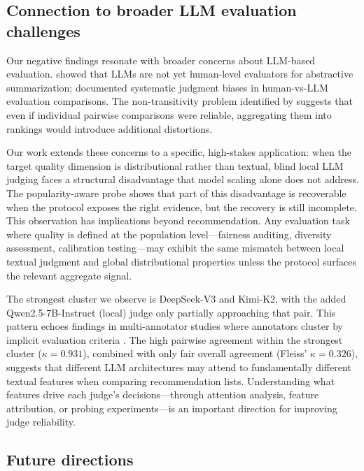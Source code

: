 \documentclass[pdflatex,sn-basic,referee,lineno]{sn-jnl}
\begin{document}
\subsection{Connection to broader LLM evaluation challenges}

Our negative findings resonate with broader concerns about LLM-based evaluation. \citet{shen2023large} showed that LLMs are not yet human-level evaluators for abstractive summarization; \citet{chen2024humans} documented systematic judgment biases in human-vs-LLM evaluation comparisons. The non-transitivity problem identified by \citet{liu2025nontransitivity} suggests that even if individual pairwise comparisons were reliable, aggregating them into rankings would introduce additional distortions.

Our work extends these concerns to a specific, high-stakes application: when the target quality dimension is distributional rather than textual, blind local LLM judging faces a structural disadvantage that model scaling alone does not address. The popularity-aware probe shows that part of this disadvantage is recoverable when the protocol exposes the right evidence, but the recovery is still incomplete. This observation has implications beyond recommendation. Any evaluation task where quality is defined at the population level---fairness auditing, diversity assessment, calibration testing---may exhibit the same mismatch between local textual judgment and global distributional properties unless the protocol surfaces the relevant aggregate signal.

The strongest cluster we observe is DeepSeek-V3 and Kimi-K2, with the added Qwen2.5-7B-Instruct (local) judge only partially approaching that pair. This pattern echoes findings in multi-annotator studies where annotators cluster by implicit evaluation criteria \citep{fleiss1971kappa}. The high pairwise agreement within the strongest cluster ($\kappa = 0.931$), combined with only fair overall agreement (Fleiss' $\kappa = 0.326$), suggests that different LLM architectures may attend to fundamentally different textual features when comparing recommendation lists. Understanding what features drive each judge's decisions---through attention analysis, feature attribution, or probing experiments---is an important direction for improving judge reliability.

\subsection{Future directions}
\end{document}
